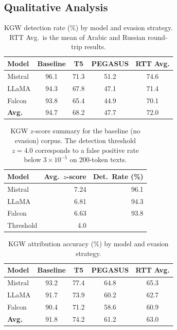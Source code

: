 \documentclass[11pt]{article}
\begin{document}
\subsection{Qualitative Analysis}

\begin{table}[t]
\centering
\small
{\setlength{\tabcolsep}{5pt}%
\begin{tabular}{@{}lcccc@{}}
\toprule
\textbf{Model} & \textbf{Baseline} & \textbf{T5} & \textbf{PEGASUS} & \textbf{RTT Avg.} \\
\midrule
Mistral & 96.1 & 71.3 & 51.2 & 74.6 \\
LLaMA   & 94.3 & 67.8 & 47.1 & 71.4 \\
Falcon  & 93.8 & 65.4 & 44.9 & 70.1 \\
\midrule
\textbf{Avg.} & 94.7 & 68.2 & 47.7 & 72.0 \\
\bottomrule
\end{tabular}}
\caption{KGW detection rate (\%) by model and evasion strategy.
RTT Avg.\ is the mean of Arabic and Russian round-trip results.}
\label{tab:detection_full}
\end{table}

\begin{table}[t]
\centering
\small
\begin{tabular}{@{}lrr@{}}
\toprule
\textbf{Model} & \textbf{Avg.\ $z$-score} & \textbf{Det.\ Rate (\%)} \\
\midrule
Mistral & 7.24 & 96.1 \\
LLaMA   & 6.81 & 94.3 \\
Falcon  & 6.63 & 93.8 \\
\midrule
Threshold & 4.0 & \\
\bottomrule
\end{tabular}
\caption{KGW $z$-score summary for the baseline (no evasion) corpus.
The detection threshold $z=4.0$ corresponds to a false positive rate
below $3{\times}10^{-5}$ on 200-token texts.}
\label{tab:zscore_summary}
\end{table}

\begin{table}[t]
\centering
\small
{\setlength{\tabcolsep}{5pt}%
\begin{tabular}{@{}lcccc@{}}
\toprule
\textbf{Model} & \textbf{Baseline} & \textbf{T5} & \textbf{PEGASUS} & \textbf{RTT Avg.} \\
\midrule
Mistral & 93.2 & 77.4 & 64.8 & 65.3 \\
LLaMA   & 91.7 & 73.9 & 60.2 & 62.7 \\
Falcon  & 90.4 & 71.2 & 58.6 & 60.9 \\
\midrule
\textbf{Avg.} & 91.8 & 74.2 & 61.2 & 63.0 \\
\bottomrule
\end{tabular}}
\caption{KGW attribution accuracy (\%) by model and evasion strategy.}
\label{tab:attribution_kgw}
\end{table}
\end{document}

